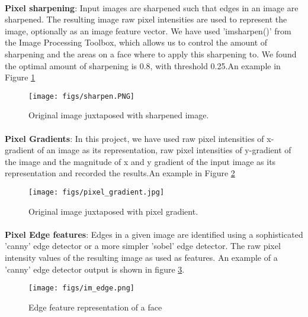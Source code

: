 \documentclass[10pt,twocolumn,letterpaper]{article}
\begin{document}
\paragraph{}
\textbf{
Pixel sharpening}: Input images are sharpened such that edges in an image are sharpened. The resulting image raw pixel intensities are used to represent the image, optionally as an image feature vector. We have used 'imsharpen()' from the Image Processing Toolbox, which allows us to control the amount of sharpening and the areas on a face where to apply this sharpening to. We found the optimal amount of sharpening is 0.8, with threshold 0.25.An example in Figure \ref{fig:sharp_image}

\begin{figure}[h]
\texttt{[image: figs/sharpen.PNG]}
\caption{Original image juxtaposed with sharpened image.}
\label{fig:sharp_image}
\end{figure}

\paragraph{}
\textbf{
Pixel Gradients}: In this project, we have used raw pixel intensities of x-gradient of an image as its representation, raw pixel intensities of y-gradient of the image and the magnitude of x and y gradient of the input image as its representation and recorded the results.An example in Figure \ref{fig:grad_image}

\begin{figure}[h]
\texttt{[image: figs/pixel\_gradient.jpg]}
\caption{Original image juxtaposed with pixel gradient.}
\label{fig:grad_image}
\end{figure}

\paragraph{}
\textbf{Pixel Edge features}: Edges in a given image are identified using a sophisticated 'canny' edge detector or a more simpler 'sobel' edge detector. The raw pixel intensity values of the resulting image as used as features. An example of a 'canny' edge detector output is shown in figure \ref{fig:edge_image}.

\begin{figure}[h]
\texttt{[image: figs/im\_edge.png]}
\caption{Edge feature representation of a face}
\label{fig:edge_image}
\end{figure}
\end{document}
